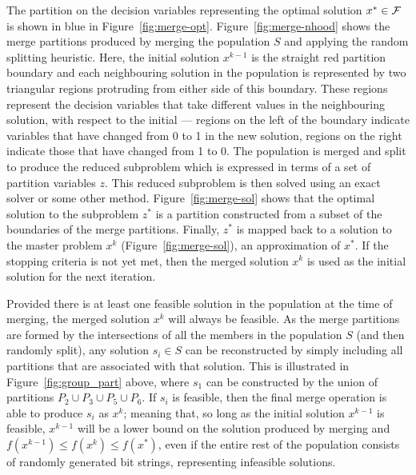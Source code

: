 \documentclass[authoryear,11pt,square,number,times,super,comma]{elsarticle}
\begin{document}
The partition on the decision variables representing the optimal solution $x^* \in {\cal F}$ is shown in blue in Figure~\ref{fig:merge-opt}. Figure~\ref{fig:merge-nhood} shows the merge partitions produced by merging the population $S$ and applying the random splitting heuristic. Here, the initial solution $x^{k-1}$ is the straight red partition boundary and each neighbouring solution in the population is represented by two triangular regions protruding from either side of this boundary. These regions represent the decision variables that take different values in the neighbouring solution, with respect to the initial --- regions on the left of the boundary indicate variables that have changed from 0 to 1 in the new solution, regions on the right indicate those that have changed from 1 to 0. The population is merged and split to produce the reduced subproblem which is expressed in terms of a set of partition variables $z$. This reduced subproblem is then solved using an exact solver or some other method. Figure~\ref{fig:merge-sol} shows that the optimal solution to the subproblem $z^*$ is a partition constructed from a subset of the boundaries of the merge partitions. Finally, $z^*$ is mapped back to a solution to the master problem $x^k$ (Figure~\ref{fig:merge-sol}), an approximation of $x^*$. If the stopping criteria is not yet met, then the merged solution $x^k$ is used as the initial solution for the next iteration.

Provided there is at least one feasible solution in the population at the time of merging, the merged solution $x^k$ will always be feasible. As the merge partitions are formed by the intersections of all the members in the population $S$ (and then randomly split), any solution $s_i \in S$ can be reconstructed by simply including all partitions that are associated with that solution. This is illustrated in Figure~\ref{fig:group_part} above, where $s_1$ can be constructed by the union of partitions $P_2 \cup P_3 \cup P_5 \cup P_6$. If $s_i$ is feasible, then the final merge operation is able to produce $s_i$ as $x^k$; meaning that, so long as the initial solution $x^{k-1}$ is feasible, $x^{k-1}$ will be a lower bound on the solution produced by merging and $f(x^{k-1}) \leq f(x^k) \leq f(x^*)$, even if the entire rest of the population consists of randomly generated bit strings, representing infeasible solutions.
\end{document}
